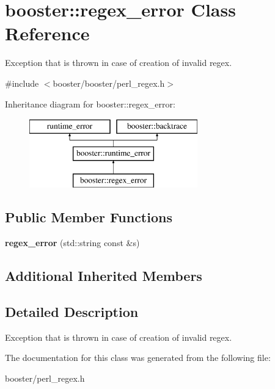 \section{booster\-:\-:regex\-\_\-error Class Reference}
\label{classbooster_1_1regex__error}


Exception that is thrown in case of creation of invalid regex.  




{\ttfamily \#include $<$booster/booster/perl\-\_\-regex.\-h$>$}

Inheritance diagram for booster\-:\-:regex\-\_\-error\-:\begin{figure}[H]
\begin{center}
\leavevmode
\includegraphics[height=3.000000cm]{classbooster_1_1regex__error}
\end{center}
\end{figure}
\subsection*{Public Member Functions}
\begin{DoxyCompactItemize}
\item 
{\bfseries regex\-\_\-error} (std\-::string const \&s)\label{classbooster_1_1regex__error_ab47c1b94a4b23450d0d349c9fcdc62fc}

\end{DoxyCompactItemize}
\subsection*{Additional Inherited Members}


\subsection{Detailed Description}
Exception that is thrown in case of creation of invalid regex. 

The documentation for this class was generated from the following file\-:\begin{DoxyCompactItemize}
\item 
booster/perl\-\_\-regex.\-h\end{DoxyCompactItemize}
